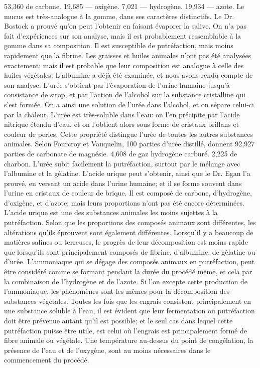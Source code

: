 53,360 de carbone.
19,685 — oxigène.
7,021 — hydrogène.
19,934 — azote.
Le mucus est très-analogue à la gomme, dans ses caractères distinctifs. Le Dr. Bostock\setcounter{page}{154} a prouvé qu'on peut l'obtenir en faisant évaporer la salive. On n'a pas fait d'expériences sur son analyse, mais il est probablement ressemblable à la gomme dans sa composition. Il est susceptible de putréfaction, mais moins rapidement que la fibrine.
Les graisses et huiles animales n'ont pas été analysées exactement; mais il est probable que leur composition est analogue à celle des huiles végétales.
L'albumine a déjà été examinée, et nous avons rendu compte de son analyse.
L'urée s'obtient par l'évaporation de l'urine humaine jusqu'à consistance de sirop, et par l'action de l'alcohol sur la substance cristalline qui s'est formée. On a ainsi une solution de l'urée dans l'alcohol, et on sépare celui-ci par la chaleur. L'urée est très-soluble dans l'eau: on l'en précipite par l'acide nitrique étendu d'eau, et on l'obtient alors sous forme de cristaux brillans et couleur de perles. Cette propriété distingue l'urée de toutes les autres substances animales.
Selon Fourcroy et Vauquelin, 100 parties d'urée distillé, donnent
92,927 parties de carbonate de magnésie.
4,608 de gaz hydrogène carburé.
2,225 de charbon.
\setcounter{page}{155} L’urée subit facilement la putréfaction, surtout par le mélange avec l’albumine et la gélatine.
L’acide urique peut s’obtenir, ainsi que le Dr. Egan l’a prouvé, en versant un acide dans l’urine humaine; et il se forme souvent dans l’urine en cristaux de couleur de brique. Il est composé de carbone, d’hydrogène, d’oxigène, et d’azote; mais leurs proportions n’ont pas été encore déterminées. L’acide urique est une des substances animales les moins sujettes à la putréfaction.
Selon que les proportions des composés animaux sont différentes, les altérations qu’ils éprouvent sont également différentes. Lorsqu’il y a beaucoup de matières salines ou terreuses, le progrès de leur décomposition est moins rapide que lorsqu’ils sont principalement composés de fibrine, d’albumine, de gélatine ou d’urée. L’ammoniaque qui se dégage des composés animaux en putréfaction, peut être considéré comme se formant pendant la durée du procédé même, et cela par la combinaison de l’hydrogène et de l’azote. Si l’on excepte cette production de l’ammoniaque, les phénomènes sont les mêmes pour la décomposition des substances végétales.
Toutes les fois que les engrais consistent principalement en une substance soluble à\setcounter{page}{156} l'eau, il est évident que leur fermentation ou putréfaction doit être prévenue autant qu'il est possible; et le seul cas dans lequel cette putréfaction puisse être utile, est celui où l'engrais est principalement formé de fibre animale ou végétale. Une température au-dessus du point de congélation, la présence de l'eau et de l'oxygène, sont au moins nécessaires dans le commencement du procédé.
